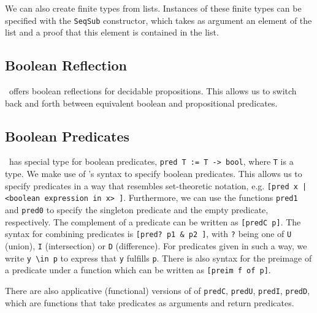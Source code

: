We can also create finite types from lists.
Instances of these finite types can be specified with the \lstinline{SeqSub} constructor, 
which takes as argument an element of the list and a proof that this element is contained in the list.


\subsection{Boolean Reflection}
\ssreflect\ offers boolean reflections for decidable propositions. 
This allows us to switch back and forth between equivalent boolean and propositional predicates.

\subsection{Boolean Predicates}
\ssreflect\ has special type for boolean predicates, \lstinline{pred T := T -> bool}, where \lstinline{T} is a type.
We make use of \ssreflect's syntax to specify boolean predicates.
This allows us to specify predicates in a way that resembles set-theoretic notation, e.g. 
\lstinline{[pred x | <boolean expression in x> ]}.
Furthermore, we can use the functions \lstinline{pred1} and \lstinline{pred0} to specify the singleton predicate and the empty predicate, respectively.
The complement of a predicate can be written as \lstinline{[predC p]}. 
The syntax for combining predicates is \lstinline{[pred? p1 & p2 ]}, with \lstinline{?} being one of 
\lstinline{U} (union), \lstinline{I} (intersection) or \lstinline{D} (difference).
For predicates given in such a way, we write \lstinline{y \in p} to express that \lstinline{y} fulfills \lstinline{p}.
There is also syntax for the preimage of a predicate under a function
which can be written as \lstinline{[preim f of p]}.



There are also applicative (functional) versions of of \lstinline{predC}, \lstinline{predU}, \lstinline{predI}, \lstinline{predD}, 
which are functions that take predicates as arguments and return predicates.

